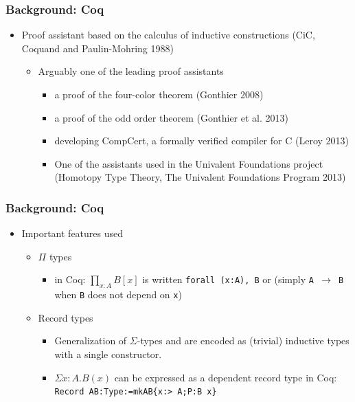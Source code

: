 \documentclass[11pt]{beamer}
\begin{document}
\begin{frame}
  \frametitle{Background: Coq}
  \begin{itemize}
  \item	Proof assistant based on the calculus of inductive
    constructions (CiC, Coquand and Paulin-Mohring 1988)
    \begin{itemize}
    \item Arguably one of the leading proof assistants
      \begin{itemize}
      \item  a proof of the four-color
        theorem (Gonthier 2008)
      \item  a proof of the odd order theorem (Gonthier et al. 2013)
      \item  developing CompCert, a formally verified compiler for C (Leroy 2013)
      \item One of the assistants used in the Univalent Foundations project (Homotopy Type Theory, The Univalent Foundations Program 2013)
      \end{itemize}\end{itemize}
  \end{itemize}
\end{frame}


\begin{frame}
  \frametitle{Background: Coq}
  \begin{itemize}
  \item Important features used
    \begin{itemize}
    \item $\Pi$ types 
      \begin{itemize}
      \item	in Coq: $\prod_{x:A}B[x]$ is written \texttt{forall (x:A), B} or (simply
        \texttt{A $\to$ B} when \texttt{B} does not depend on \texttt{x}) \end{itemize}
    \item 	Record types
      \begin{itemize}
      \item  Generalization of $\Sigma$-types and are encoded as (trivial) inductive types with a single
        constructor.
      \item	$\Sigma x:A. B(x)$ can be expressed as a dependent record type in Coq:
        \texttt{Record AB:Type:=mkAB\{x:> A;P:B x\}}
      \end{itemize}\end{itemize}\end{itemize}
\end{frame}
\end{document}

